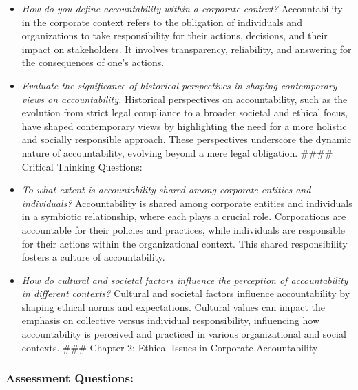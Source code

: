 \documentclass[
  letterpaper,
  DIV=11,
  numbers=noendperiod]{scrreprt}
\begin{document}
\begin{itemize}
\item
  \emph{How do you define accountability within a corporate context?}
  Accountability in the corporate context refers to the obligation of
  individuals and organizations to take responsibility for their
  actions, decisions, and their impact on stakeholders. It involves
  transparency, reliability, and answering for the consequences of one's
  actions.
\item
  \emph{Evaluate the significance of historical perspectives in shaping
  contemporary views on accountability.} Historical perspectives on
  accountability, such as the evolution from strict legal compliance to
  a broader societal and ethical focus, have shaped contemporary views
  by highlighting the need for a more holistic and socially responsible
  approach. These perspectives underscore the dynamic nature of
  accountability, evolving beyond a mere legal obligation. \#\#\#\#
  Critical Thinking Questions:
\item
  \emph{To what extent is accountability shared among corporate entities
  and individuals?} Accountability is shared among corporate entities
  and individuals in a symbiotic relationship, where each plays a
  crucial role. Corporations are accountable for their policies and
  practices, while individuals are responsible for their actions within
  the organizational context. This shared responsibility fosters a
  culture of accountability.
\item
  \emph{How do cultural and societal factors influence the perception of
  accountability in different contexts?} Cultural and societal factors
  influence accountability by shaping ethical norms and expectations.
  Cultural values can impact the emphasis on collective versus
  individual responsibility, influencing how accountability is perceived
  and practiced in various organizational and social contexts. \#\#\#
  Chapter 2: Ethical Issues in Corporate Accountability
\end{itemize}

\subsubsection{Assessment Questions:}\label{assessment-questions-7}
\end{document}
